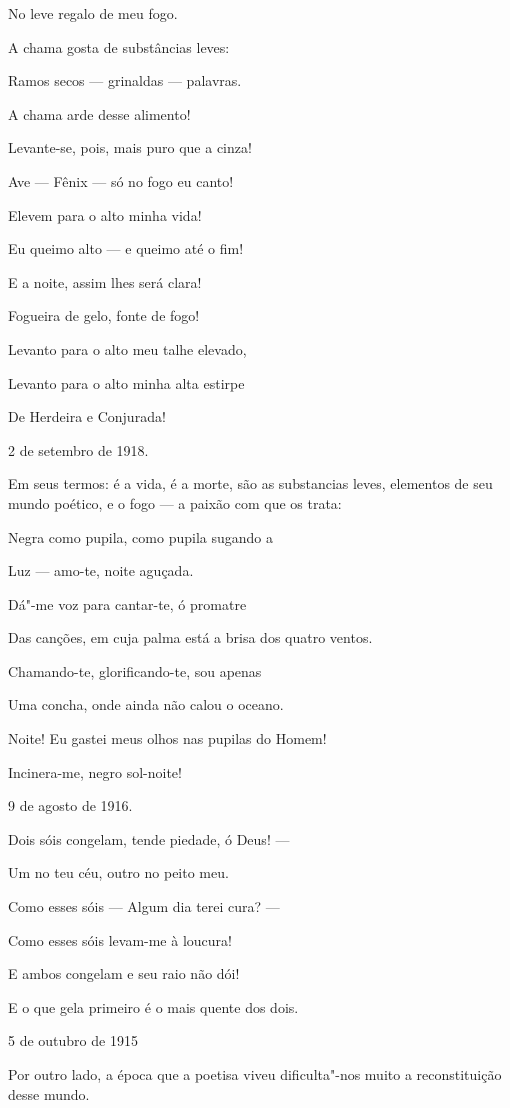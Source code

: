 No leve regalo de meu fogo.

A chama gosta de substâncias leves:

Ramos secos --- grinaldas --- palavras.

A chama arde desse alimento!

Levante-se, pois, mais puro que a cinza!

Ave --- Fênix --- só no fogo eu canto!

Elevem para o alto minha vida!

Eu queimo alto --- e queimo até o fim!

E a noite, assim lhes será clara!

Fogueira de gelo, fonte de fogo!

Levanto para o alto meu talhe elevado,

Levanto para o alto minha alta estirpe

De Herdeira e Conjurada!

2 de setembro de 1918.

Em seus termos: é a vida, é a morte, são as substancias leves, elementos
de seu mundo poético, e o fogo --- a paixão com que os trata:

Negra como pupila, como pupila sugando a

Luz --- amo-te, noite aguçada.

Dá"-me voz para cantar-te, ó promatre

Das canções, em cuja palma está a brisa dos quatro ventos.

Chamando-te, glorificando-te, sou apenas

Uma concha, onde ainda não calou o oceano.

Noite! Eu gastei meus olhos nas pupilas do Homem!

Incinera-me, negro sol-noite!

9 de agosto de 1916.

Dois sóis congelam, tende piedade, ó Deus! ---

Um no teu céu, outro no peito meu.

Como esses sóis --- Algum dia terei cura? ---

Como esses sóis levam-me à loucura!

E ambos congelam e seu raio não dói!

E o que gela primeiro é o mais quente dos dois.

5 de outubro de 1915

Por outro lado, a época que a poetisa viveu dificulta"-nos muito a
reconstituição desse mundo.

